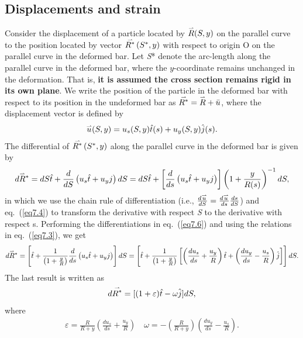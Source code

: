 \documentclass{AeroStructure-ERJohnson}
\def\harp#1{\smash{\mathord{\buildrel{\lower3pt\hbox{$\scriptscriptstyle\rightharpoonup$}}\over{#1}}}}
\begin{document}
\subsection{Displacements and strain}\label{sec7.1.1}

Consider the displacement of a particle located by $\harp{R}(S, y)$ on the parallel curve to the position located by vector $\harp{R^{*}}\left(S^{*}, y\right)$ with respect to origin O on the parallel curve in the deformed bar. Let \textit{S}* denote the arc-length along the parallel curve in the deformed bar, where the $y$-coordinate remains unchanged in the deformation. That is, \textbf{it is assumed the cross section remains rigid in its own plane}. We write the position of the particle in the deformed bar with respect to its position in the undeformed bar as $\harp{R^{*}} =\harp{R}+\bar{u}$, where the displacement vector is defined by\vspace*{-3pt}
\begin{align}\label{eq7.5}
\harp{u}(S, y)=u_{s}(S, y) \hat{t}(s)+u_{y}(S, y) \hat{j}(s).
\end{align}
The differential of $\harp{R^{*}}\left(S^{*}, y\right)$ along the parallel curve in the deformed bar is given by\pagebreak
\begin{align}\label{eq7.6}
d \harp{R}^{*}=d S \hat{t}+\frac{d}{d S}\left(u_{s} \hat{t}+u_{y} j\right) d S=d S \hat{t}+\left[\frac{d}{d s}\left(u_{s} \hat{t}+u_{y} j\right)\right]\left(1+\frac{y}{R(s)}\right)^{-1} d S,
\end{align}
in which we use the chain rule of differentiation \Big(i.e., $\frac{d \harp{u}}{d S}=\frac{d \harp{u}}{d s} \frac{d s}{d S}$\Big) and eq.~(\ref{eq7.4}) to transform the derivative with respect \textit{S} to the derivative with respect s. Performing the differentiations in eq.~(\ref{eq7.6}) and using the relations in eq.~(\ref{eq7.3}), we get
\begin{align}\label{eq7.7}
d \harp{R}^{*}=\left[\hat{t}+\frac{1}{\left(1+\frac{y}{R}\right)} \frac{d}{d s}\left(u_{s} \hat{t}+u_{y} j\right)\right] d S=\left[\hat{t}+\frac{1}{\left(1+\frac{y}{R}\right)}\left[\left(\frac{d u_{s}}{d s}+\frac{u_{y}}{R}\right) \hat{t}+\left(\frac{d u_{y}}{d s}-\frac{u_{s}}{R}\right) \hat{j}\right]\right] d S.
\end{align}
The last result is written as\vspace*{-5pt}
\begin{align}\label{eq7.8}
d \harp{R^{*}}=[(1+\varepsilon) \hat{t}-\omega \hat{j}] d S,
\end{align}
where\vspace*{-5pt}
\begin{align}\label{eq7.9}
\varepsilon=\frac{R}{R+y}\left(\frac{d u_{s}}{d s}+\frac{u_{y}}{R}\right) \quad \omega=-\left(\frac{R}{R+y}\right)\left(\frac{d u_{y}}{d s}-\frac{u_{s}}{R}\right).
\end{align}
\end{document}

